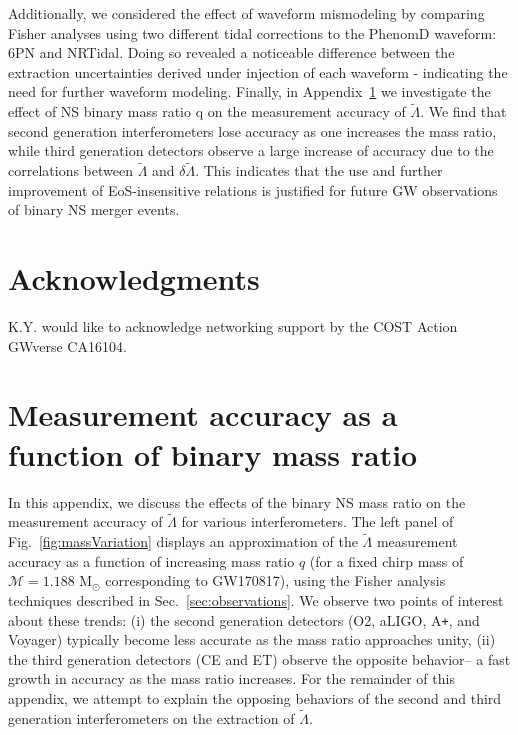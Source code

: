 \documentclass[prd,twocolumn,nofootinbib,superscriptaddress,amsmath,amssymb]{revtex4-1}
\begin{document}
Additionally, we considered the effect of waveform mismodeling by comparing Fisher analyses using two different tidal corrections to the PhenomD waveform: 6PN and NRTidal.
Doing so revealed a noticeable difference between the extraction uncertainties derived under injection of each waveform - indicating the need for further waveform modeling.
Finally, in Appendix~\ref{app:measurement} we investigate the effect of NS binary mass ratio q on the measurement accuracy of $\tilde\Lambda$.
We find that second generation interferometers lose accuracy as one increases the mass ratio, while third generation detectors observe a large increase of accuracy due to the correlations between $\tilde\Lambda$ and $\delta\tilde\Lambda$.
This indicates that the use and further improvement of EoS-insensitive relations is justified for future GW observations of binary NS merger events.


\section*{Acknowledgments}\label{acknowledgments}
K.Y. would like to acknowledge networking support by the COST Action GWverse CA16104.


\appendix
\section{Measurement accuracy as a function of binary mass ratio}\label{app:measurement}
In this appendix, we discuss the effects of the binary NS mass ratio on the measurement accuracy of $\tilde\Lambda$ for various interferometers. 
The left panel of Fig.~\ref{fig:massVariation} displays an approximation of the $\tilde\Lambda$ measurement accuracy as a function of increasing mass ratio $q$ (for a fixed chirp mass of $\mathcal{M}=1.188 \text{ M}_{\odot}$ corresponding to GW170817), using the Fisher analysis techniques described in Sec.~\ref{sec:observations}.
We observe two points of interest about these trends: (i) the second generation detectors (O2, aLIGO, A\texttt{+}, and Voyager) typically become less accurate as the mass ratio approaches unity, (ii) the third generation detectors (CE and ET) observe the opposite behavior-- a fast growth in accuracy as the mass ratio increases.
For the remainder of this appendix, we attempt to explain the opposing behaviors of the second and third generation interferometers on the extraction of $\tilde\Lambda$.
\end{document}
